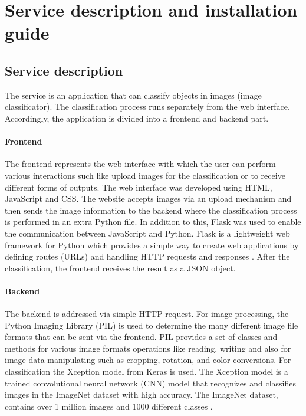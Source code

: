 \chapter{Service description and installation guide}

\section{Service description}
The service is an application that can classify objects in images (image classificator). The classification process runs separately from the web interface. Accordingly, the application is divided into a frontend and backend part.

\subsubsection{Frontend}
The frontend represents the web interface with which the user can perform various interactions such like upload images for the classification or to receive different forms of outputs. The web interface was developed using HTML, JavaScript and CSS. The website accepts images via an upload mechanism and then sends the image information to the backend where the classification process is performed in an extra Python file. In addition to this, Flask was used to enable the communication between JavaScript and Python. Flask is a lightweight web framework for Python which provides a simple way to create web applications by defining routes (URLs) and handling HTTP requests and responses \cite{Flask:2010}. After  the classification, the frontend receives the result as a JSON object. 

\subsubsection{Backend}
The backend is addressed via simple HTTP request. For image processing, the Python Imaging Library (PIL) is used to determine the many different image file formats that can be sent via the frontend. PIL provides a set of classes and methods for various image formats operations like reading, writing and also for image data manipulating such as cropping, rotation, and color conversions. For classification the Xception model from Keras is used. The Xception model is a trained convolutional neural network (CNN) model that recognizes and classifies images in the ImageNet dataset with high accuracy. The ImageNet dataset, contains over 1 million images and 1000 different classes \cite{Xception:2017}.

